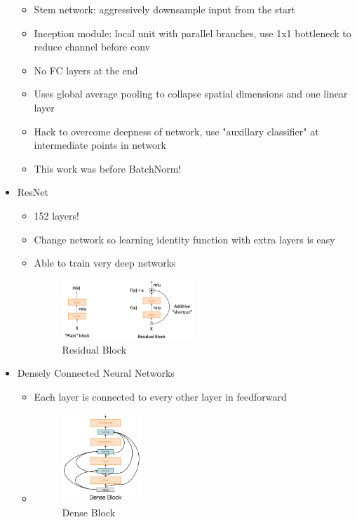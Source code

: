 \documentclass[../main.tex]{subfiles}
\begin{document}
\begin{itemize}
\begin{itemize}
    \item Stem network: aggressively downsample input from the start
    \item Inception module: local unit with parallel branches, use 1x1 bottleneck to reduce channel before conv
    \item No FC layers at the end
    \item Uses global average pooling to collapse spatial dimensions and one linear layer
    \item Hack to overcome deepness of network, use "auxillary classifier" at intermediate points in network
    \item This work was before BatchNorm!
  \end{itemize}
  \item ResNet
  \begin{itemize}
    \item 152 layers!
    \item Change network so learning identity function with extra layers is easy
    \item Able to train very deep networks
    \begin{figure}[h]
      \caption{Residual Block}
      \centering
      \includegraphics[width=0.5\textwidth]{../imgs/residual_block.png}
    \end{figure}
  \end{itemize}
  \item Densely Connected Neural Networks
  \begin{itemize}
    \item Each layer is connected to every other layer in feedforward
    \item
    \begin{figure}[h]
      \caption{Dense Block}
      \centering
      \includegraphics[width=0.3\textwidth]{../imgs/dense_block.png}

\end{figure}
\end{itemize}
\end{itemize}
\end{document}
